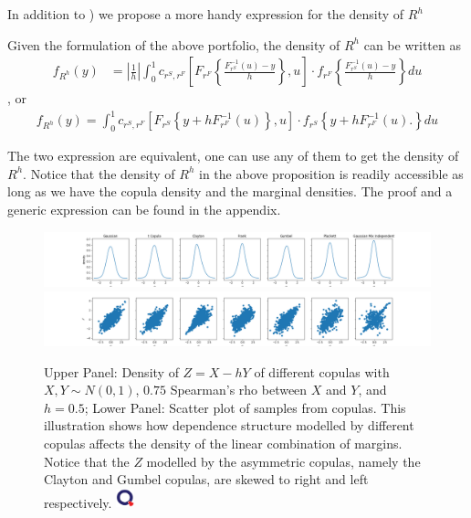 In addition to \cite{barbi2014copula}) we propose a more handy expression for the density of $R^h$

\begin{prop} Given the formulation of the above portfolio, the density of $R^h$ can be written as
  \begin{align}
  f_{R^h}(y) &= \left|\frac{1}{h}\right|\int_0^1 c_{r^S, r^F} \left[
  F_{r^F}\left\{\frac{F^{-1}_{r^S}(u)-y}{h}\right\}, u
  \right]
   \cdot
  f_{r^F}
  \left\{\frac{F^{-1}_{r^S}(u)-y}{h}\right\} du \label{eq:density1}
  \end{align}, or
    \begin{align}
      f_{R^h}(y)
      = \int_0^1 c_{r^S, r^F} \left[
      F_{r^S}\left\{y + h F^{-1}_{r^F}(u)\right\}, u
      \right]
       \cdot
      f_{r^S}
      \left\{
      y+ hF^{-1}_{r^F}(u).
      \right\} du\label{eq:density2}
  \end{align}
  \end{prop}
The two expression are equivalent, one can use any of them to get the density of $R^h$.
Notice that the density of $R^h$ in the above proposition is readily accessible as long as we have
the copula density and the marginal densities.
The proof and a generic expression can be found in the appendix.
\begin{figure}[h]
\includegraphics[width=\textwidth]{_pics/density illustration1.png}
\includegraphics[width=\textwidth]{_pics/density illustration2.png}
  \caption{Upper Panel: Density of $Z= X - hY$ of different copulas with
  $X, Y \sim N(0,1)$,
  $0.75$ Spearman's rho between $X$ and $Y$, and $h=0.5$;
  Lower Panel: Scatter plot of samples from copulas.
  This illustration shows how dependence structure modelled by different copulas affects the density of the linear combination
  of margins.
  Notice that the $Z$ modelled by the asymmetric copulas, namely the Clayton and Gumbel copulas, are skewed to right
  and left respectively. \href{http://www.quantlet.com/}{\includegraphics[width=15pt]{_pics/qletlogo_tr.png}}}
\label{fig:density illustration}
\end{figure}

